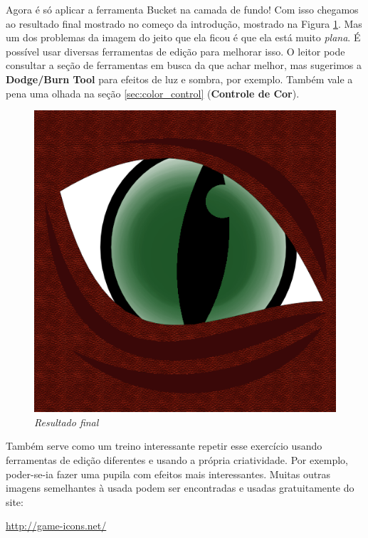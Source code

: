 \documentclass[12pt,onecolumn]{article}
\begin{document}
    Agora é só aplicar a ferramenta Bucket na camada de fundo! Com isso chegamos
    ao resultado final mostrado no começo da introdução, mostrado na Figura
    \ref{fig:final}. Mas um dos problemas da imagem do jeito que ela ficou é que
    ela está muito {\it plana}. É possível usar diversas ferramentas de edição
    para melhorar isso. O leitor pode consultar a seção de ferramentas em
    busca da que achar melhor, mas sugerimos a {\bf Dodge/Burn Tool} para
    efeitos de luz e sombra, por exemplo. Também vale a pena uma olhada na seção
    \ref{sec:color_control} ({\bf Controle de Cor}).
    
    \begin{figure}
      \centering
      \includegraphics[width=\linewidth]{draft00.png}
      \caption{
        \footnotesize
        \it
        Resultado final
      }
      \label{fig:final}
    \end{figure}
    
    Também serve como um treino interessante repetir esse exercício usando
    ferramentas de edição diferentes e usando a própria criatividade. Por
    exemplo, poder-se-ia fazer uma pupila com efeitos mais interessantes.
    Muitas outras imagens semelhantes à usada podem ser encontradas e usadas
    gratuitamente do site:
    
    \begin{center}
      \url{http://game-icons.net/}
    \end{center}
      
\end{document}

